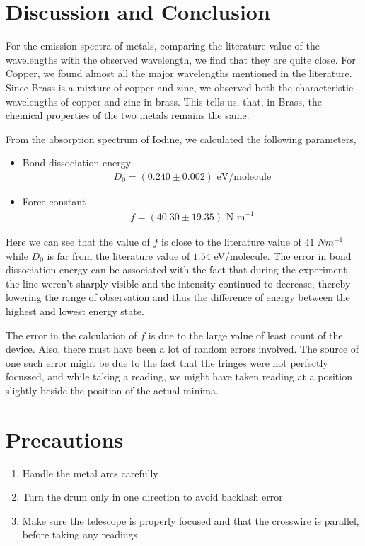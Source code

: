 \section{Discussion and Conclusion}

For the emission spectra of metals, comparing the literature value of the wavelengths with the observed wavelength, we find that they are quite close. For Copper, we found almost all the major wavelengths mentioned in the literature. Since Brass is a mixture of copper and zinc, we observed both the characteristic wavelengths of copper and zinc in brass. This tells us, that, in Brass, the chemical properties of the two metals remains the same.

From the absorption spectrum of Iodine, we calculated the following parameters,

\begin{itemize}
    \item Bond dissociation energy
    \begin{align*}
        D_0 = (0.240 \pm 0.002) \text{ eV/molecule}
    \end{align*}
    \item Force constant
    \begin{align*}
        f=(40.30 \pm 19.35) \text{ N m}^{-1}
    \end{align*}
\end{itemize}

Here we can see that the value of $f$ is close to the literature value of $41\; N m^{-1}$ while $D_0$ is far from the literature value of $1.54$ eV/molecule. The error in bond dissociation energy can be associated with the fact that during the experiment the line weren't sharply visible and the intensity continued to decrease, thereby lowering the range of observation and thus the difference of energy between the highest and lowest energy state.

The error in the calculation of $f$ is due to the large value of least count of the device. Also, there must have been a lot of random errors involved. The source of one such error might be due to the fact that the fringes were not perfectly focussed, and while taking a reading, we might have taken reading at a position slightly beside the position of the actual minima.

\section{Precautions}

    \begin{enumerate}
        \item Handle the metal arcs carefully
        \item Turn the drum only in one direction to avoid backlash error
        \item Make sure the telescope is properly focused and that the crosswire is parallel, before taking any readings.
    \end{enumerate}
